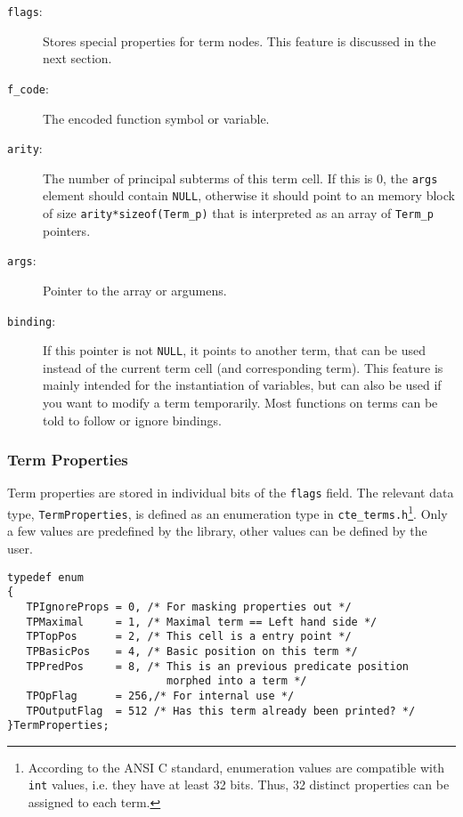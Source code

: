 \begin{description}
\item[\textmd{\texttt{flags}}:] Stores special properties for term
  nodes. This feature is discussed in the next section.
\item[\textmd{\texttt{f\_code}}:] The encoded function symbol or
  variable.
\item[\textmd{\texttt{arity}}:] The number of principal subterms of
  this term cell. If this is 0, the \texttt{args} element should
  contain \texttt{NULL}, otherwise it should point to an memory block
  of size \texttt{arity*sizeof(Term\_p)} that is interpreted as an
  array of \texttt{Term\_p} pointers.
\item[\textmd{\texttt{args}}:] Pointer to the array or argumens.
\item[\textmd{\texttt{binding}}:] If this pointer is not
  \texttt{NULL}, it points to another term, that can be used instead
  of the current term cell (and corresponding term). This feature is
  mainly intended for the instantiation of variables, but can also be
  used if you want to modify a term temporarily. Most functions on
  terms can be told to follow or ignore bindings.
\end{description}


\subsubsection{Term Properties}

Term properties are stored in individual bits of the \texttt{flags}
field. The relevant data type, \texttt{TermProperties}, is defined as
an enumeration type in \texttt{cte\_terms.h}\footnote{According to the
  ANSI C standard, enumeration values are compatible with \texttt{int}
  values, i.e. they have at least 32 bits. Thus, 32 distinct
  properties can be assigned to each term.}. Only a few values are
predefined by the library, other values can be defined by the user.

\small
\begin{verbatim}
typedef enum 
{
   TPIgnoreProps = 0, /* For masking properties out */
   TPMaximal     = 1, /* Maximal term == Left hand side */
   TPTopPos      = 2, /* This cell is a entry point */
   TPBasicPos    = 4, /* Basic position on this term */
   TPPredPos     = 8, /* This is an previous predicate position
                         morphed into a term */
   TPOpFlag      = 256,/* For internal use */
   TPOutputFlag  = 512 /* Has this term already been printed? */
}TermProperties;
\end{verbatim}
\normalsize

